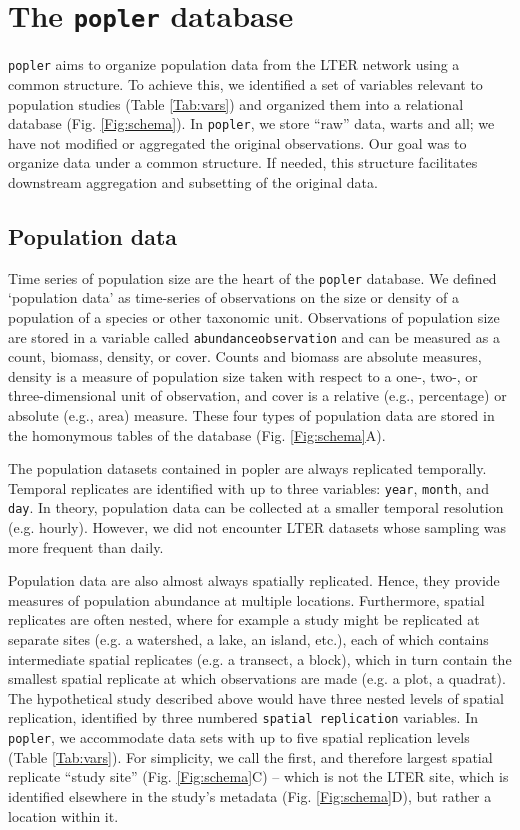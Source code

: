 \documentclass{article}\usepackage[]{graphicx}\usepackage[]{color}
\begin{document}
\section*{The \texttt{popler} database}
\texttt{popler} aims to organize population data from the LTER network using a common structure. To achieve this, we identified a set of variables relevant to population studies (Table \ref{Tab:vars}) and organized them into a relational database (Fig. \ref{Fig:schema}). In \texttt{popler}, we store ``raw'' data, warts and all; we have not modified or aggregated the original observations. Our goal was to organize data under a common structure. If needed, this structure facilitates downstream aggregation and subsetting of the original data. 

\subsection*{Population data}
Time series of population size are the heart of the \texttt{popler} database. We defined `population data' as time-series of observations on the size or density of a population of a species or other taxonomic unit. Observations of population size are stored in a variable called \texttt{abundance\textunderscore observation} and can be measured as a count, biomass, density, or cover. Counts and biomass are absolute measures, density is a measure of population size taken with respect to a one-, two-, or three-dimensional unit of observation, and cover is a relative (e.g., percentage) or absolute (e.g., area) measure. These four types of population data are stored in the homonymous tables of the database (Fig. \ref{Fig:schema}A).

The population datasets contained in popler are always replicated temporally. Temporal replicates are identified with up to three variables: \texttt{year}, \texttt{month}, and \texttt{day}. In theory, population data can be collected at a smaller temporal resolution (e.g. hourly). However, we did not encounter LTER datasets whose sampling was more frequent than daily. 

Population data are also almost always spatially replicated. Hence, they provide measures of population abundance at multiple locations. Furthermore, spatial replicates are often nested, where for example a study might be replicated at separate sites (e.g. a watershed, a lake, an island, etc.), each of which contains intermediate spatial replicates (e.g. a transect, a block), which in turn contain the smallest spatial replicate at which observations are made (e.g. a plot, a quadrat). The hypothetical study described above would have three nested levels of spatial replication, identified by three numbered \texttt{spatial replication} variables. In \texttt{popler}, we accommodate data sets with up to five spatial replication levels (Table \ref{Tab:vars}). For simplicity, we call the first, and therefore largest spatial replicate ``study site'' (Fig. \ref{Fig:schema}C) -- which is not the LTER site, which is identified elsewhere in the study's metadata (Fig. \ref{Fig:schema}D), but rather a location within it. 
\end{document}
